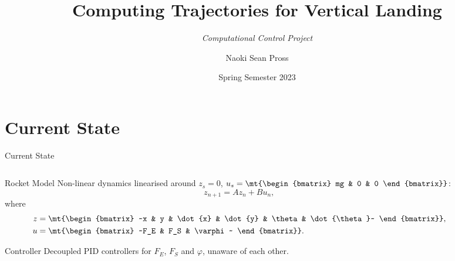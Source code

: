 \documentclass[xetex, smaller, aspectratio=43]{beamer}
\title{Computing Trajectories for Vertical Landing}
\subtitle{\slshape Computational Control Project}
\author{Naoki Sean Pross}
\date{Spring Semester 2023}
\institute[ETHZ]{ETH Zürich}
\begin{document}
\frame{
  \maketitle
  \centering
  \doclicenseImage[imagewidth=5em]
}

\section{Current State}

\begin{frame}[fragile]{Current State}
  \begin{columns}
    \begin{column}[b]{.5\linewidth}
      \begin{block}{Rocket Model}
        Non-linear dynamics linearised around $z_s = 0$,
        $u_s = \mt{\begin{bmatrix} mg & 0 & 0 \end{bmatrix}}$:
        \[
          z_{n+1} = A z_n + B u_n,
        \]
        where
        \begin{align*}
          z &= \mt{\begin{bmatrix}
            ~x & y & \dot{x} & \dot{y} & \theta & \dot{\theta}~
          \end{bmatrix}}, \\
          u &= \mt{\begin{bmatrix}
            ~F_E & F_S & \varphi~
          \end{bmatrix}}.
        \end{align*}
      \end{block}
      \begin{block}{Controller}
        Decoupled PID controllers for $F_E$, $F_S$ and $\varphi$,
        unaware of each other.
      \end{block}
    \end{column}
    \begin{column}[b]{.5\linewidth}
      \begin{center}
\end{center}
\end{column}
\end{columns}
\end{frame}
\end{document}
